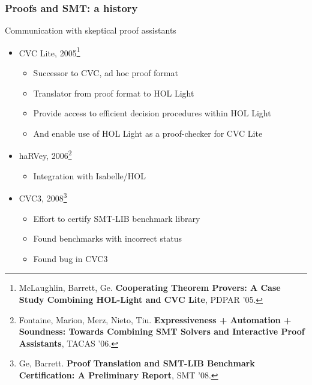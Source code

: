 \documentclass[svgnames,table,mathserif]{beamer}
\begin{document}
\begin{frame}\frametitle{Proofs and SMT: a history}

\begin{block}{Communication with skeptical proof assistants}
\begin{itemize}
\item CVC Lite, 2005\footnote{\tiny McLaughlin,
  Barrett, Ge. {\bf Cooperating Theorem Provers: A Case Study Combining
    HOL-Light and CVC Lite}, PDPAR '05.}
\begin{itemize}
\item Successor to CVC, ad hoc proof format
\item Translator from proof format to HOL Light
\item Provide access to efficient decision procedures within HOL Light
\item And enable use of HOL Light as a proof-checker for CVC Lite
\end{itemize}
\item haRVey, 2006\footnote{\tiny
Fontaine, Marion, Merz, Nieto, Tiu. {\bf Expressiveness + Automation +
  Soundness: Towards Combining SMT Solvers and Interactive Proof Assistants},
TACAS '06.}
\begin{itemize}
\item Integration with Isabelle/HOL
\end{itemize}
\item CVC3, 2008\footnote{\tiny
Ge, Barrett. {\bf Proof Translation and SMT-LIB Benchmark Certification: A
  Preliminary Report}, SMT '08.}
\begin{itemize}
\item Effort to certify SMT-LIB benchmark library
\item Found benchmarks with incorrect status
\item Found bug in CVC3
\end{itemize}
\end{itemize}
\end{block}

\end{frame}
\end{document}
